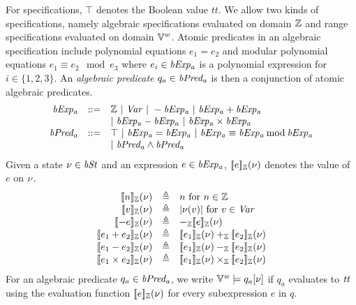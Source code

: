 For specifications, $\top$ denotes the Boolean value $\mathit{tt}$.
We allow two kinds of specifications, namely algebraic specifications evaluated on domain $\mathbb{Z}$ and range specifications evaluated on domain $\mathbb{V}^{\mathit{w}}$.
Atomic predicates in an algebraic specification include polynomial equations $e_1 = e_2$ and modular polynomial equations $e_1 \equiv e_2 \mod e_3$ where $e_i \in \mathit{bExp_a}$ is a polynomial expression for $i \in \{1, 2, 3\}$.
An \emph{algebraic predicate} $q_a \in \mathit{bPred_a}$ is then a conjunction of atomic algebraic predicates.
\[
\begin{array}{rcl}
  \mathit{bExp_a} & ::= & \mathbb{Z} \ |\ \mathit{Var} \ |\ - \mathit{bExp_a} \ |\ \mathit{bExp_a} + \mathit{bExp_a} \\
          &     & |\ \mathit{bExp_a} - \mathit{bExp_a} \ |\ \mathit{bExp_a} \times \mathit{bExp_a} \\
  \mathit{bPred_a} & ::= & \top \ |\ \mathit{bExp_a} = \mathit{bExp_a}\ |\ \mathit{bExp_a} \equiv \mathit{bExp_a} \mathbin{\textmd{mod}} \mathit{bExp_a} \\
           &     & |\ \mathit{bPred_a} \wedge \mathit{bPred_a} \\
\end{array}
\]
Given a state $\nu \in \mathit{bSt}$ and an expression $e \in \mathit{bExp_a}$, $[\![{e}]\!]_{\mathbb{Z}}(\nu)$ denotes the value of $e$ on $\nu$.
\[
\begin{array}{rcl}
  \zvalueof{n}(\bvst) & \defn & n \textmd{ for $n \in \bbfZ$} \\
  \zvalueof{v}(\bvst) & \defn & \unsigned{\bvst(v)} \textmd{ for $v \in \Var$} \\
  \zvalueof{- e}(\bvst) & \defn & -_\bbfZ \zvalueof{e}(\bvst) \\
  \zvalueof{e_1 + e_2}(\bvst) & \defn & \zvalueof{e_1}(\bvst) +_\bbfZ \zvalueof{e_2}(\bvst) \\
  \zvalueof{e_1 - e_2}(\bvst) & \defn & \zvalueof{e_1}(\bvst) -_\bbfZ \zvalueof{e_2}(\bvst) \\
  \zvalueof{e_1 \times e_2}(\bvst) & \defn & \zvalueof{e_1}(\bvst) \times_\bbfZ \zvalueof{e_2}(\bvst) \\
\end{array}
\]
For an algebraic predicate $q_a \in \mathit{bPred_a}$, we write $\mathbb{V}^{\mathit{w}} \models q_a[\nu]$ if $q_a$ evaluates to $\mathit{tt}$ using the evaluation function $[\![{e}]\!]_{\mathbb{Z}}(\nu)$ for every subexpression $e$ in $q$.

